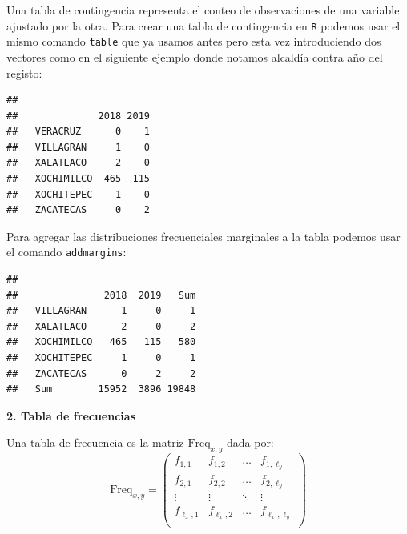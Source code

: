 \documentclass[
]{book}
\newenvironment{Shaded}{\begin{snugshade}}{\end{snugshade}}
\newcommand{\FunctionTok}[1]{\textcolor[rgb]{0.00,0.00,0.00}{#1}}
\newcommand{\NormalTok}[1]{#1}
\newcommand{\SpecialCharTok}[1]{\textcolor[rgb]{0.00,0.00,0.00}{#1}}
\begin{document}
Una tabla de contingencia representa el conteo de observaciones de una variable ajustado por la otra. Para crear una tabla de contingencia en \texttt{R} podemos usar el mismo comando \texttt{table} que ya usamos antes pero esta vez introduciendo dos vectores como en el siguiente ejemplo donde notamos alcaldía contra año del registo:

\begin{Shaded}
\end{Shaded}

\begin{verbatim}
##             
##              2018 2019
##   VERACRUZ      0    1
##   VILLAGRAN     1    0
##   XALATLACO     2    0
##   XOCHIMILCO  465  115
##   XOCHITEPEC    1    0
##   ZACATECAS     0    2
\end{verbatim}

Para agregar las distribuciones frecuenciales marginales a la tabla podemos usar el comando \texttt{addmargins}:

\begin{Shaded}
\end{Shaded}

\begin{verbatim}
##             
##               2018  2019   Sum
##   VILLAGRAN      1     0     1
##   XALATLACO      2     0     2
##   XOCHIMILCO   465   115   580
##   XOCHITEPEC     1     0     1
##   ZACATECAS      0     2     2
##   Sum        15952  3896 19848
\end{verbatim}

\textbf{2. Tabla de frecuencias}

Una tabla de frecuencia es la matriz \(\text{Freq}_{x,y}\) dada por:
\[
\text{Freq}_{x,y} = \begin{pmatrix}
f_{1,1} & f_{1,2} & \dots & f_{1, \ell_y} \\
f_{2,1} & f_{2,2} & \dots & f_{2, \ell_y} \\
\vdots  & \vdots  & \ddots & \vdots \\
f_{\ell_x,1} & f_{\ell_x,2} & \dots & f_{\ell_x, \ell_y} \\
\end{pmatrix}
\]
\end{document}
